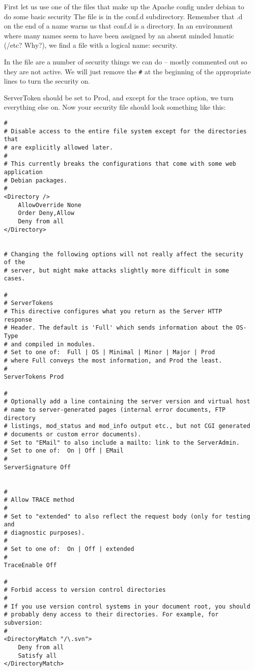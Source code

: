 \documentclass[12pt, a4paper]{article}
\begin{document}
First let us use one of the files that make up the Apache config under debian to do some basic security
The file is in the conf.d subdirectory. Remember that .d on the end of a name warns us that conf.d is a directory. In an environment where many names seem to have been assigned by an absent minded lunatic (/etc? Why?), we find a file with a logical name: security.

In the file are a number of security things we can do – mostly commented out so they are not active. We will just remove the \verb|#| at the beginning of the appropriate lines to turn the security on.

ServerToken should be set to Prod, and except for the trace option, we turn everything else on. 
Now your security file should look something like this:

\begin{verbatim}
# 
# Disable access to the entire file system except for the directories that 
# are explicitly allowed later. 
# 
# This currently breaks the configurations that come with some web application 
# Debian packages. 
# 
<Directory /> 
	AllowOverride None 
	Order Deny,Allow 
	Deny from all 
</Directory> 


# Changing the following options will not really affect the security of the 
# server, but might make attacks slightly more difficult in some cases. 

# 
# ServerTokens 
# This directive configures what you return as the Server HTTP response 
# Header. The default is 'Full' which sends information about the OS-Type 
# and compiled in modules. 
# Set to one of:  Full | OS | Minimal | Minor | Major | Prod 
# where Full conveys the most information, and Prod the least. 
# 
ServerTokens Prod 

# 
# Optionally add a line containing the server version and virtual host 
# name to server-generated pages (internal error documents, FTP directory 
# listings, mod_status and mod_info output etc., but not CGI generated 
# documents or custom error documents). 
# Set to "EMail" to also include a mailto: link to the ServerAdmin. 
# Set to one of:  On | Off | EMail 
# 
ServerSignature Off 


# 
# Allow TRACE method 
# 
# Set to "extended" to also reflect the request body (only for testing and 
# diagnostic purposes). 
# 
# Set to one of:  On | Off | extended 
# 
TraceEnable Off 

# 
# Forbid access to version control directories 
# 
# If you use version control systems in your document root, you should 
# probably deny access to their directories. For example, for subversion: 
# 
<DirectoryMatch "/\.svn"> 
	Deny from all 
	Satisfy all 
</DirectoryMatch> 


\end{verbatim}
\end{document}
